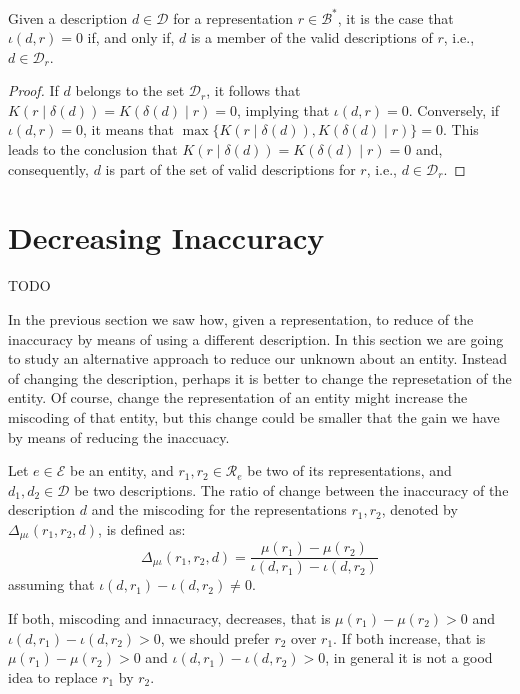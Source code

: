 \begin{proposition}\label{prop:perfect_description}
Given a description $d \in \mathcal{D}$ for a representation $r \in \mathcal{B}^\ast$, it is the case that $\iota(d, r) = 0$ if, and only if, $d$ is a member of the valid descriptions of $r$, i.e., $d \in \mathcal{D}_r$.
\end{proposition}
\begin{proof}
If $d$ belongs to the set $\mathcal{D}_r$, it follows that $K \left( r \mid \delta(d) \right) = K \left( \delta(d) \mid r \right) = 0$, implying that $\iota(d, r) = 0$. Conversely, if $\iota(d, r) = 0$, it means that $\max\{ K \left( r \mid \delta(d) \right), K \left( \delta(d) \mid r \right) \} = 0$. This leads to the conclusion that $K \left( r \mid \delta(d) \right) = K \left( \delta(d) \mid r \right) = 0$ and, consequently, $d$ is part of the set of valid descriptions for $r$, i.e., $d \in \mathcal{D}_r$.
\end{proof}

%
%

\section{Decreasing Inaccuracy}

{\color{red} TODO

In the previous section we saw how, given a representation, to reduce of the inaccuracy by means of using a different description. In this section we are going to study an alternative approach to reduce our unknown about an entity. Instead of changing the description, perhaps it is better to change the represetation of the entity. Of course, change the representation of an entity might increase the miscoding of that entity, but this change could be smaller that the gain we have by means of reducing the inaccuacy.

\begin{definition}
Let $e \in \mathcal{E}$ be an entity, and $r_1, r_2 \in \mathcal{R}_e$ be two of its representations, and $d_1, d_2 \in \mathcal{D}$ be two descriptions. The ratio of change between the inaccuracy of the description $d$ and the miscoding for the representations $r_1, r_2$, denoted by $\Delta_{\mu \iota} ( r_1, r_2, d )$, is defined as:
\[
\Delta_{\mu \iota} ( r_1, r_2, d ) = \frac{\mu(r_1) - \mu(r_2)}{\iota(d, r_1) - \iota(d, r_2)}
\] 
assuming that $\iota(d, r_1) - \iota(d, r_2) \neq 0$.
\end{definition}

If both, miscoding and innacuracy, decreases, that is $\mu(r_1) - \mu(r_2) > 0$ and $\iota(d, r_1) - \iota(d, r_2) > 0$, we should prefer $r_2$ over $r_1$. If both increase, that is $\mu(r_1) - \mu(r_2) > 0$ and $\iota(d, r_1) - \iota(d, r_2) > 0$, in general it is not a good idea to replace $r_1$ by $r_2$.

}

